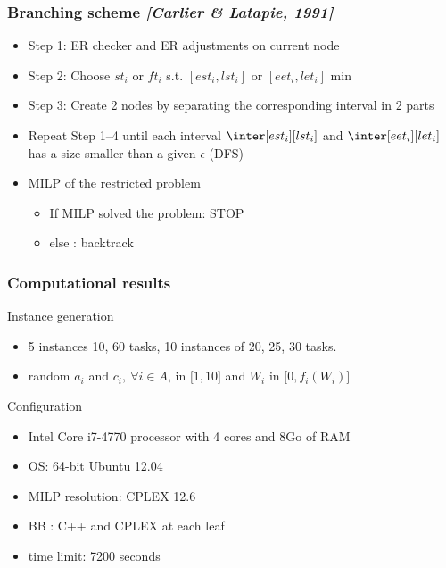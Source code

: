 \begin{frame}
  \frametitle{Branching scheme {\small \it \color{gray!50!black!50} [Carlier \& Latapie, 1991]}}
  \begin{itemize}
    \vfill
  \item Step 1: ER checker and ER adjustments on current node 
    \vfill    
  \item Step 2: Choose $st_i$ or $ft_i$ s.t. $[est_i,lst_i]$ or
    $[eet_i,let_i]$ min
    \vfill
  \item Step 3: Create 2 nodes by separating the corresponding interval in 2 parts
    \vfill
  \item Repeat Step 1--4 until each interval $\inter[est_i][lst_i]$ and $\inter[eet_i][let_i]$ has a size smaller than a given $\epsilon$ (DFS)
    \vfill
  \item MILP of the restricted problem
    \begin{itemize}
    \item If MILP solved the problem: STOP
    \item else : backtrack
    \end{itemize}
  \end{itemize}
  \vfill
\end{frame}


\begin{frame}
  \frametitle{Computational results}
  \begin{block}{Instance generation}
    \begin{itemize}
    \item 5 instances 10, 60 tasks, 10 instances of 20, 25, 30 tasks. 
    \item random  $a_i$ and $c_i,\ \forall i \in A$, in ${[}1,10{]}$ and $W_i$ in ${[}0,f_i(W_i){]}$
    \end{itemize}
  \end{block}
  \begin{block}{Configuration}
    \begin{itemize}
    \item Intel Core i7-4770 processor with 4 cores and 8Go of RAM
    \item OS: 64-bit Ubuntu 12.04
    \item MILP resolution: CPLEX 12.6  
    \item BB : C++ and CPLEX at each leaf
    \item time limit: 7200 seconds
    \end{itemize}
  \end{block}
  

\end{frame}


